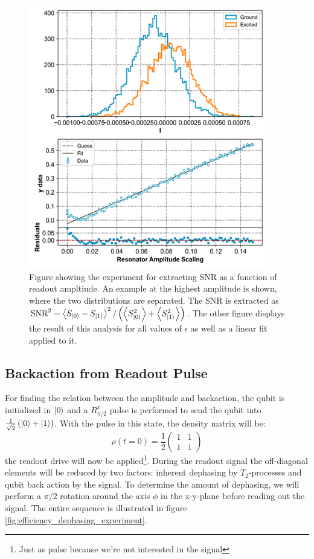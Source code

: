 \begin{figure}
    \centering
    \includegraphics{Figs/calibrations/efficiency/SNR_result.png}
    \caption{Figure showing the experiment for extracting SNR as a function of readout ampltiude. An example at the highest amplitude is shown, where the two distributions are separated. The SNR is extracted as $\text{SNR}^2 = \expval{S_{\ket{0}} - S_{\ket{1}}}^2/\left(\expval{S^2_{\ket{0}}} +\expval{S^2_{\ket{1}}}\right)$. The other figure displays the result of this analysis for all values of $\epsilon$ as well as a linear fit applied to it.}
    \label{fig:effiiency_results_SNR}
\end{figure}



\subsection{Backaction from Readout Pulse}
For finding the relation between the amplitude and backaction, the qubit is initialized in $\ket{0}$ and a $R^x_{\pi/2}$ pulse is performed to send the qubit into $\frac{1}{\sqrt{2}}\left(\ket{0} + \ket{1}\right)$. With the pulse in this state, the density matrix will be:
\begin{equation}
    \rho(t=0) = \frac12 \begin{pmatrix}1 & 1 \\ 1 & 1\end{pmatrix}
\end{equation}
the readout drive will now be applied\footnote{Just as pulse because we're not interested in the signal}. During the readout signal the off-diagonal elements will be reduced by two factors: inherent dephasing by $T_2$-processes and qubit back action by the signal. To determine the amount of dephasing, we will perform a $\pi/2$ rotation around the axis $\phi$ in the x-y-plane before reading out the signal. The entire sequence is illustrated in figure \ref{fig:efficiency_dephasing_experiment}.

